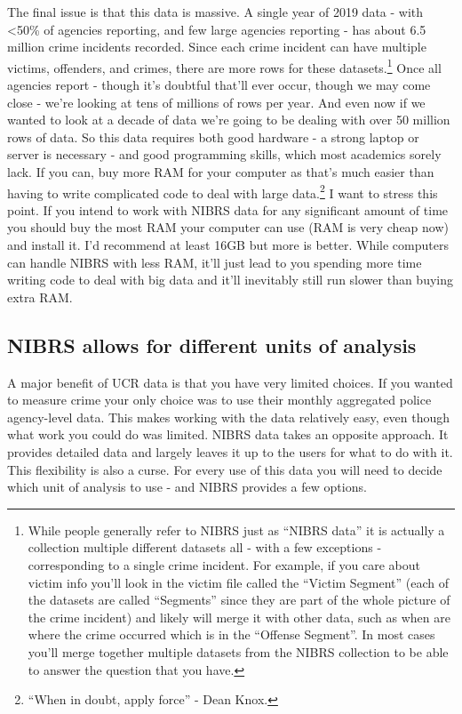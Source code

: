 \documentclass[
  12pt,
  openany]{book}
\begin{document}
The final issue is that this data is massive. A single year of 2019 data - with \textless50\% of agencies reporting, and few large agencies reporting - has about 6.5 million crime incidents recorded. Since each crime incident can have multiple victims, offenders, and crimes, there are more rows for these datasets.\footnote{While people generally refer to NIBRS just as ``NIBRS data'' it is actually a collection multiple different datasets all - with a few exceptions - corresponding to a single crime incident. For example, if you care about victim info you'll look in the victim file called the ``Victim Segment'' (each of the datasets are called ``Segments'' since they are part of the whole picture of the crime incident) and likely will merge it with other data, such as when are where the crime occurred which is in the ``Offense Segment''. In most cases you'll merge together multiple datasets from the NIBRS collection to be able to answer the question that you have.} Once all agencies report - though it's doubtful that'll ever occur, though we may come close - we're looking at tens of millions of rows per year. And even now if we wanted to look at a decade of data we're going to be dealing with over 50 million rows of data. So this data requires both good hardware - a strong laptop or server is necessary - and good programming skills, which most academics sorely lack. If you can, buy more RAM for your computer as that's much easier than having to write complicated code to deal with large data.\footnote{``When in doubt, apply force'' - Dean Knox.} I want to stress this point. If you intend to work with NIBRS data for any significant amount of time you should buy the most RAM your computer can use (RAM is very cheap now) and install it. I'd recommend at least 16GB but more is better. While computers can handle NIBRS with less RAM, it'll just lead to you spending more time writing code to deal with big data and it'll inevitably still run slower than buying extra RAM.

\hypertarget{nibrs-allows-for-different-units-of-analysis}{%
\subsection{NIBRS allows for different units of analysis}\label{nibrs-allows-for-different-units-of-analysis}}

A major benefit of UCR data is that you have very limited choices. If you wanted to measure crime your only choice was to use their monthly aggregated police agency-level data. This makes working with the data relatively easy, even though what work you could do was limited. NIBRS data takes an opposite approach. It provides detailed data and largely leaves it up to the users for what to do with it. This flexibility is also a curse. For every use of this data you will need to decide which unit of analysis to use - and NIBRS provides a few options.
\end{document}
